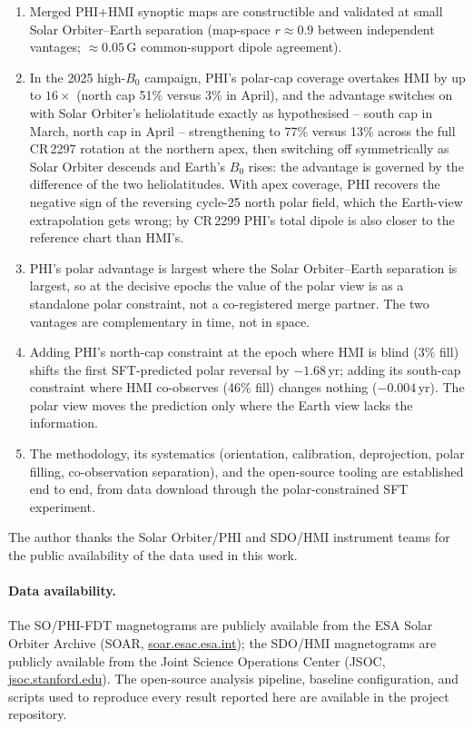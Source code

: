 \documentclass{aa}
\begin{document}
\begin{enumerate}
    \item Merged PHI+HMI synoptic maps are constructible and validated at small Solar Orbiter--Earth separation (map-space $r \approx 0.9$ between independent vantages; $\approx 0.05$\,G common-support dipole agreement).
    \item In the 2025 high-$B_0$ campaign, PHI's polar-cap coverage overtakes HMI by up to $16\times$ (north cap 51\% versus 3\% in April), and the advantage switches on with Solar Orbiter's heliolatitude exactly as hypothesised -- south cap in March, north cap in April -- strengthening to 77\% versus 13\% across the full CR\,2297 rotation at the northern apex, then switching off symmetrically as Solar Orbiter descends and Earth's $B_0$ rises: the advantage is governed by the difference of the two heliolatitudes. With apex coverage, PHI recovers the negative sign of the reversing cycle-25 north polar field, which the Earth-view extrapolation gets wrong; by CR\,2299 PHI's total dipole is also closer to the reference chart than HMI's.
    \item PHI's polar advantage is largest where the Solar Orbiter--Earth separation is largest, so at the decisive epochs the value of the polar view is as a standalone polar constraint, not a co-registered merge partner. The two vantages are complementary in time, not in space.
    \item Adding PHI's north-cap constraint at the epoch where HMI is blind (3\% fill) shifts the first SFT-predicted polar reversal by $-1.68$\,yr; adding its south-cap constraint where HMI co-observes (46\% fill) changes nothing ($-0.004$\,yr). The polar view moves the prediction only where the Earth view lacks the information.
    \item The methodology, its systematics (orientation, calibration, deprojection, polar filling, co-observation separation), and the open-source tooling are established end to end, from data download through the polar-constrained SFT experiment.
\end{enumerate}

\begin{acknowledgements}
The author thanks the Solar Orbiter/PHI and SDO/HMI instrument teams for the public availability of the data used in this work.
\end{acknowledgements}

\paragraph{Data availability.}
The SO/PHI-FDT magnetograms are publicly available from the ESA Solar Orbiter Archive (SOAR, \url{soar.esac.esa.int}); the SDO/HMI magnetograms are publicly available from the Joint Science Operations Center (JSOC, \url{jsoc.stanford.edu}). The open-source analysis pipeline, baseline configuration, and scripts used to reproduce every result reported here are available in the project repository.



\end{document}
